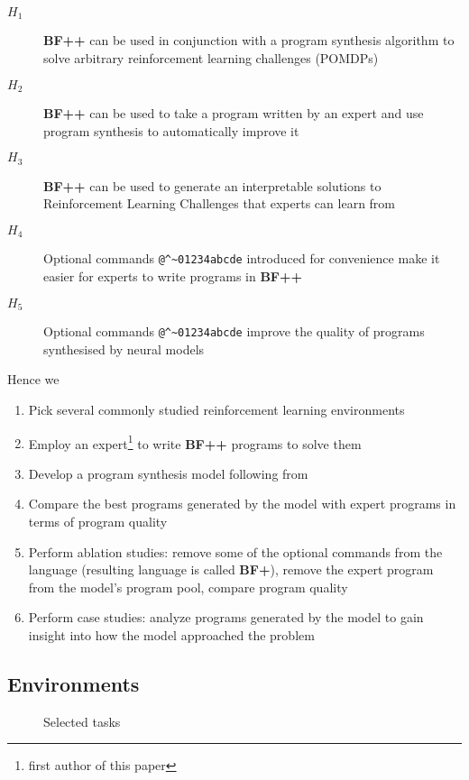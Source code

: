 \begin{description}
    \item[$H_1$] \textbf{BF++} can be used in conjunction with a program synthesis algorithm to solve arbitrary reinforcement learning challenges (POMDPs)
    \item[$H_2$] \textbf{BF++} can be used to take a program written by an expert and use program synthesis to automatically improve it
    \item[$H_3$] \textbf{BF++} can be used to generate an interpretable solutions to Reinforcement Learning Challenges that experts can learn from
    \item[$H_4$] Optional commands \verb|@^~01234abcde| introduced for convenience make it easier for experts to write programs in \textbf{BF++}
    \item[$H_5$] Optional commands \verb|@^~01234abcde| improve the quality of programs synthesised by neural models
\end{description}

Hence we

\begin{enumerate}
    \item Pick several commonly studied reinforcement learning environments
    \item Employ an expert\footnote{first author of this paper} to write \textbf{BF++} programs to solve them
    \item Develop a program synthesis model following from \cite{brain-coder}
    \item Compare the best programs generated by the model with expert programs in terms of program quality
    \item Perform ablation studies: remove some of the optional commands from the language (resulting language is called \textbf{BF+}), remove the expert program from the model's program pool, compare program quality
    \item Perform case studies: analyze programs generated by the model to gain insight into how the model approached the problem
\end{enumerate}

\subsection{Environments}
\label{sec:envs}

\begin{figure}[t]
    \centering
    \caption{Selected tasks}
    \label{fig:envs}
\end{figure}


